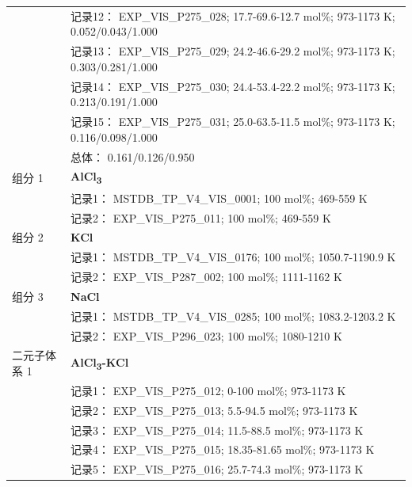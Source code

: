 \documentclass[12pt]{article}
\begin{document}
{\begin{longtable}[]{@{}
  >{\raggedright\arraybackslash}p{}
  >{\raggedright\arraybackslash}p{}@{}}
 & 记录12： EXP\_VIS\_P275\_028; 17.7-69.6-12.7 mol\%; 973-1173 K; 0.052/0.043/1.000 \\
 & 记录13： EXP\_VIS\_P275\_029; 24.2-46.6-29.2 mol\%; 973-1173 K; 0.303/0.281/1.000 \\
 & 记录14： EXP\_VIS\_P275\_030; 24.4-53.4-22.2 mol\%; 973-1173 K; 0.213/0.191/1.000 \\
 & 记录15： EXP\_VIS\_P275\_031; 25.0-63.5-11.5 mol\%; 973-1173 K; 0.116/0.098/1.000 \\
 & 总体： 0.161/0.126/0.950  \\

组分 1  & \textbf{AlCl\textsubscript{3}} \\
 & 记录1： MSTDB\_TP\_V4\_VIS\_0001; 100 mol\%; 469-559 K \\
 & 记录2： EXP\_VIS\_P275\_011; 100 mol\%; 469-559 K  \\

组分 2  & \textbf{KCl} \\
 & 记录1： MSTDB\_TP\_V4\_VIS\_0176; 100 mol\%; 1050.7-1190.9 K \\
 & 记录2： EXP\_VIS\_P287\_002; 100 mol\%; 1111-1162 K  \\

组分 3  & \textbf{NaCl} \\
 & 记录1： MSTDB\_TP\_V4\_VIS\_0285; 100 mol\%; 1083.2-1203.2 K \\
 & 记录2： EXP\_VIS\_P296\_023; 100 mol\%; 1080-1210 K  \\

二元子体系 1  & \textbf{AlCl\textsubscript{3}-KCl} \\
 & 记录1： EXP\_VIS\_P275\_012; 0-100 mol\%; 973-1173 K \\
 & 记录2： EXP\_VIS\_P275\_013; 5.5-94.5 mol\%; 973-1173 K \\
 & 记录3： EXP\_VIS\_P275\_014; 11.5-88.5 mol\%; 973-1173 K \\
 & 记录4： EXP\_VIS\_P275\_015; 18.35-81.65 mol\%; 973-1173 K \\
 & 记录5： EXP\_VIS\_P275\_016; 25.7-74.3 mol\%; 973-1173 K  \\


\end{longtable}}
\end{document}
